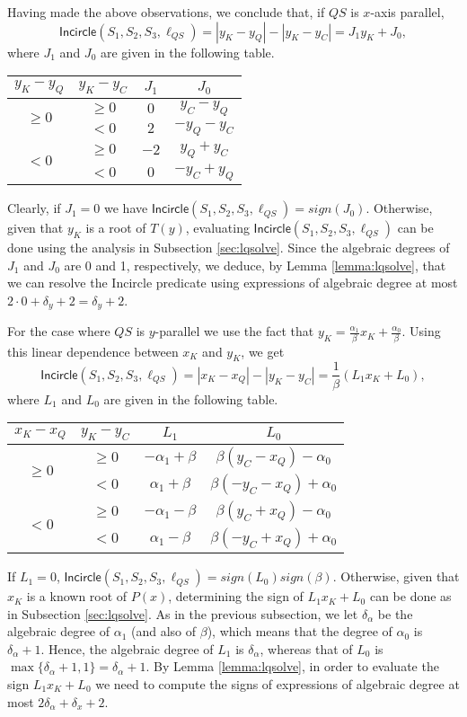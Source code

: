 \documentclass[letterpaper,11pt]{article}
\newcommand{\incircle}{\textsf{Incircle}\xspace}
\begin{document}
Having made the above observations, we conclude that, if $QS$ is
$x$-axis parallel,
\[\incircle(S_1,S_2,S_3,\ell_{QS})=|y_K-y_Q|-|y_K-y_C|=J_1y_K+J_0,\]
where $J_1$ and $J_0$ are given in the following table.
\begin{center}
\begin{tabular}{|c|c|c|c|}\hline 
    $y_K-y_Q$&$y_K-y_C$&$J_1$&$J_0$\\\hline\hline
    \multirow{2}{*}{$\geq 0$}&$\geq{}0$&$0$&$y_C-y_Q$\\\cline{2-4}
    &$<0$&$2$&$-y_Q-y_C$\\\hline
    \multirow{2}{*}{$<0$}&$\geq{}0$&$-2$&$y_Q+y_C$\\\cline{2-4}
    &$<0$&$0$&$-y_C+y_Q$\\\hline 
  \end{tabular}
\end{center}
Clearly, if $J_1=0$ we have
$\incircle(S_1,S_2,S_3,\ell_{QS})=sign(J_0)$. Otherwise,
given that $y_K$ is a root of $T(y)$, evaluating
$\incircle(S_1,S_2,S_3,\ell_{QS})$ can be done using the analysis in
Subsection \ref{sec:lqsolve}. Since the algebraic degrees of $J_1$ and
$J_0$ are 0 and 1, respectively, we deduce, by Lemma
\ref{lemma:lqsolve}, that we can resolve the \incircle predicate using
expressions of algebraic degree at most
$2\cdot{}0+\delta_y+2=\delta_y+2$.

For the case where $QS$ is $y$-parallel we use the fact that
$y_K=\frac{\alpha_1}{\beta}x_K+\frac{\alpha_0}{\beta}$. Using this
linear dependence between $x_K$ and $y_K$, we get
\[\incircle(S_1,S_2,S_3,\ell_{QS})=|x_K-x_Q|-|y_K-y_C|
=\frac{1}{\beta}(L_1x_K+L_0),\]
where $L_1$ and $L_0$ are given in the following table.
\begin{center}
\begin{tabular}{|c|c|c|c|}\hline 
    $x_K-x_Q$&$y_K-y_C$&$L_1$&$L_0$\\\hline\hline
    \multirow{2}{*}{$\geq 0$}
    &$\geq{}0$&$-\alpha_1+\beta$&$\beta(y_C-x_Q)-\alpha_0$\\\cline{2-4}
    &$<0$&$\alpha_1+\beta$&$\beta(-y_C-x_Q)+\alpha_0$\\\hline
    \multirow{2}{*}{$<0$}
    &$\geq{}0$&$-\alpha_1-\beta$&$\beta(y_C+x_Q)-\alpha_0$\\\cline{2-4}
    &$<0$&$\alpha_1-\beta$&$\beta(-y_C+x_Q)+\alpha_0$\\\hline 
  \end{tabular}
\end{center}
If $L_1=0$,
$\incircle(S_1,S_2,S_3,\ell_{QS})=sign(L_0)sign(\beta)$.
Otherwise, given that $x_K$ is a known root of $P(x)$,
determining the sign of $L_1x_K+L_0$ can be done as in Subsection
\ref{sec:lqsolve}. As in the previous subsection, we let
$\delta_\alpha$ be the algebraic degree of $\alpha_1$ (and also of
$\beta$), which means that the degree of $\alpha_0$ is
$\delta_\alpha+1$. Hence, the algebraic degree of $L_1$ is
$\delta_\alpha$, whereas that of $L_0$ is
$\max\{\delta_\alpha+1,1\}=\delta_\alpha+1$. By Lemma
\ref{lemma:lqsolve}, in order to evaluate the sign $L_1x_K+L_0$ we
need to compute the signs of expressions of algebraic degree at most
$2\delta_\alpha+\delta_x+2$.
\end{document}
